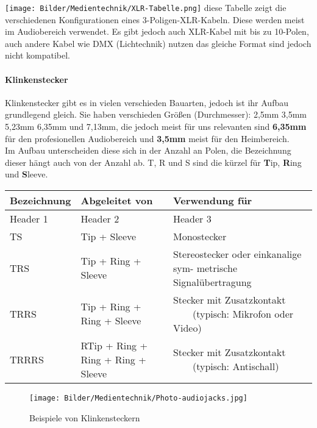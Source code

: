 \texttt{[image: Bilder/Medientechnik/XLR-Tabelle.png]} \cite{dewiki:241460075}
diese Tabelle zeigt die verschiedenen Konfigurationen eines 3-Poligen-XLR-Kabeln. Diese werden meist im Audiobereich verwendet. Es gibt jedoch auch XLR-Kabel mit bis zu 10-Polen, auch andere Kabel wie DMX (Lichtechnik) nutzen das gleiche Format sind jedoch nicht kompatibel.

\paragraph{Klinkenstecker}
Klinkenstecker gibt es in vielen verschieden Bauarten, jedoch ist ihr Aufbau grundlegend gleich. Sie haben verschieden Größen (Durchmesser): 2,5mm 3,5mm 5,23mm 6,35mm und 7,13mm, die jedoch meist für uns relevanten sind \textbf{6,35mm} für den profesionellen Audiobereich und \textbf{3,5mm} meist für den Heimbereich.\\
Im Aufbau unterscheiden diese sich in der Anzahl an Polen, die Bezeichnung dieser hängt auch von der Anzahl ab. T, R und S sind die kürzel für \textbf{T}ip, \textbf{R}ing und \textbf{S}leeve.\\

\begin{longtable}{|p{}|p{}|p{}|}
\hline
\rowcolor{gray!50} Bezeichnung & Abgeleitet von & Verwendung für \\
\hline
\endfirsthead

\hline
Header 1 & Header 2 & Header 3 \\
\hline
\endhead

\hline
\endfoot

\hline
\endlastfoot

TS & Tip + Sleeve & Monostecker \\
\hline
 \vspace{1mm}TRS & Tip + Ring + Sleeve & Stereostecker oder einkanalige sym- metrische Signalübertragung \\
\hline
TRRS & Tip + Ring + Ring + Sleeve & Stecker mit Zusatzkontakt ~~~~(typisch: Mikrofon oder Video) \\
\hline
TRRRS & RTip + Ring + Ring + Ring + Sleeve & Stecker mit Zusatzkontakt ~~~~(typisch: Antischall) \\
\hline

\end{longtable}
\cite{dewiki:245747795}


\begin{figure}[h]
    \centering
    \texttt{[image: Bilder/Medientechnik/Photo-audiojacks.jpg]}
    \caption{Beispiele von Klinkensteckern}
    \label{fig:Klinkenstecker}
\end{figure}
\newpage

